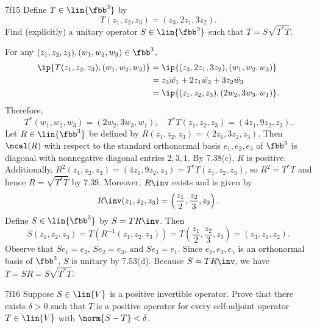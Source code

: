 \begin{exercise}{7f15}
    Define $T \in \lin{\fbb^3}$ by
    \[
        T(z_1, z_2, z_3) = (z_3, 2z_1, 3z_2).
    \]
    Find (explicitly) a unitary operator $S \in \lin{\fbb^3}$ such that $T = S\sqrt{T^\ast T}$.
\end{exercise}

\begin{sol}
    For any $(z_1, z_2, z_3), (w_1, w_2, w_3) \in \fbb^3$, 
    \begin{align*}
        \ip{T(z_1, z_2, z_3), (w_1, w_2, w_3)} &= \ip{(z_3, 2z_1, 3z_2), (w_1, w_2, w_3)} \\
        &= z_3\bar{w_1} + 2z_1\bar{w_2} + 3z_2\bar{w_3} \\
        &= \ip{(z_1, z_2, z_3), (2 w_2, 3 w_3, w_1)}.
    \end{align*}
    Therefore,
    \[
        T^\ast(w_1, w_2, w_3) = (2 w_2, 3 w_3, w_1), \quad T^\ast T(z_1, z_2, z_3) = (4z_1, 9z_2, z_3).
    \]
    Let $R \in \lin{\fbb^3}$ be defined by $R(z_1, z_2, z_3) = (2z_1, 3z_2, z_3)$.
    Then $\mcal(R)$ with respect to the standard orthonormal basis $e_1, e_2, e_3$ of $\fbb^3$ is diagonal with nonnegative diagonal entries $2, 3, 1$.
    By 7.38(c), $R$ is positive.
    Additionally, $R^2(z_1, z_2, z_3) = (4z_1, 9z_2, z_3) = T^\ast T(z_1, z_2, z_3)$, so $R^2 = T^\ast T$ and hence $R = \sqrt{T^\ast T}$ by 7.39.
    Moreover, $R\inv$ exists and is given by
    \[
        R\inv(z_1, z_2, z_3) = \left(\frac{z_1}{2}, \frac{z_2}{3}, z_3\right).
    \]
    Define $S \in \lin{\fbb^3}$ by $S = TR\inv$.
    Then
    \[
        S(z_1, z_2, z_3) = T(R^{-1}(z_1, z_2, z_3)) = T\left(\frac{z_1}{2}, \frac{z_2}{3}, z_3\right) = (z_3, z_1, z_2).
    \]
    Observe that $S e_1 = e_2$, $S e_2 = e_3$, and $S e_3 = e_1$.
    Since $e_2, e_3, e_1$ is an orthonormal basis of $\fbb^3$, $S$ is unitary by 7.53(d).
    Because $S = TR\inv$, we have $T = SR = S\sqrt{T^\ast T}$.
\end{sol}

\begin{exercise}{7f16}
    Suppose $S \in \lin{V}$ is a positive invertible operator.
    Prove that there exists $\delta > 0$ such that $T$ is a positive operator for every self-adjoint operator $T \in \lin{V}$ with $\norm{S - T} < \delta$.
\end{exercise}

